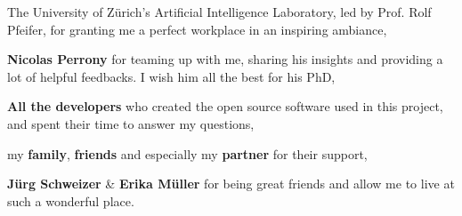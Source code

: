 \documentclass[a4paper,10pt,twoside,titlepage,headings=small,bibliography=totocnumbered,headsepline]{scrartcl}
\begin{document}
The University of Z\"urich's Artificial Intelligence Laboratory, led by Prof. Rolf Pfeifer, for granting me a perfect workplace in an inspiring ambiance,
\vspace{.2cm}

\textbf{Nicolas Perrony} for teaming up with me, sharing his insights and providing a lot of helpful feedbacks. I wish him all the best for his PhD,
\vspace{.2cm}

\textbf{All the developers} who created the open source software used in this project, and spent their time to answer my questions,
\vspace{.2cm}

my \textbf{family}, \textbf{friends} and especially my \textbf{partner} for their support,
\vspace{.2cm}

\textbf{J\"urg Schweizer} \& \textbf{Erika M\"uller} for being great friends and allow me to live at such a wonderful place.

\end{document}
